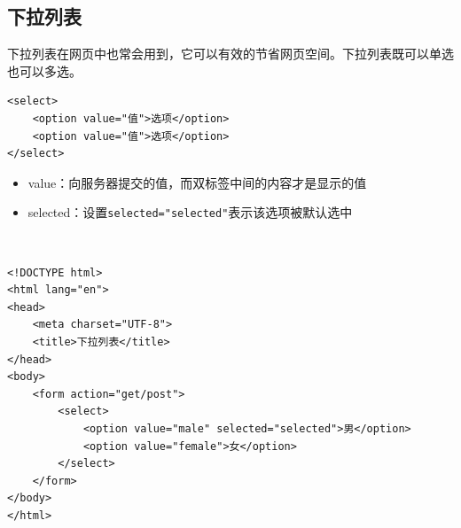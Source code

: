 \subsection{下拉列表}

下拉列表在网页中也常会用到，它可以有效的节省网页空间。下拉列表既可以单选也可以多选。 \\

\begin{lstlisting}[style=htmlcssjs]
<select>
    <option value="值">选项</option>
    <option value="值">选项</option>
</select>
\end{lstlisting}

\begin{itemize}
	\item value：向服务器提交的值，而双标签中间的内容才是显示的值
	\item selected：设置\lstinline|selected="selected"|表示该选项被默认选中
\end{itemize}

 \\
\begin{lstlisting}[style=htmlcssjs]
<!DOCTYPE html>
<html lang="en">
<head>
    <meta charset="UTF-8">
    <title>下拉列表</title>
</head>
<body>
    <form action="get/post">
        <select>
            <option value="male" selected="selected">男</option>
            <option value="female">女</option>
        </select>
    </form>
</body>
</html>
\end{lstlisting}

\newpage